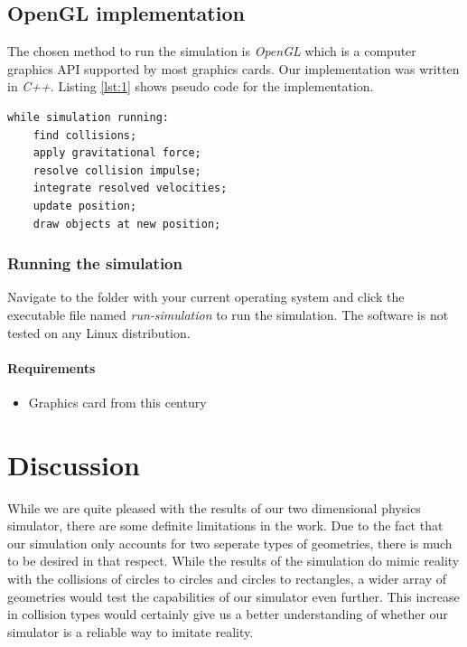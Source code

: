\documentclass[a4paper,12pt]{report}
\begin{document}
\section{OpenGL implementation}
\label{sec:opengl}

The chosen method to run the simulation is \emph{OpenGL} which is a computer graphics API supported by most graphics cards. Our implementation was written in \emph{C++}. Listing \ref{lst:1} shows pseudo code for the implementation.

\begin{lstlisting}[caption={Pseudo code for the simulation loop.}, label=lst:1]
while simulation running:
    find collisions;
    apply gravitational force;
    resolve collision impulse;
    integrate resolved velocities;
    update position;
    draw objects at new position;
\end{lstlisting}


\subsection{Running the simulation}

Navigate to the folder with your current operating system and click the executable file named \emph{run-simulation} to run the simulation. The software is not tested on any Linux distribution.

\subsubsection{Requirements}
\begin{itemize}
    \item Graphics card from this century
\end{itemize}


\chapter{Discussion}

While we are quite pleased with the results of our two dimensional physics simulator, there are some definite limitations in the work. Due to the fact that our simulation only accounts for two seperate types of geometries, there is much to be desired in that respect. While the results of the simulation do mimic reality with the collisions of circles to circles and circles to rectangles, a wider array of geometries would test the capabilities of our simulator even further. This increase in collision types would certainly give us a better understanding of whether our simulator is a reliable way to imitate reality.
\end{document}
